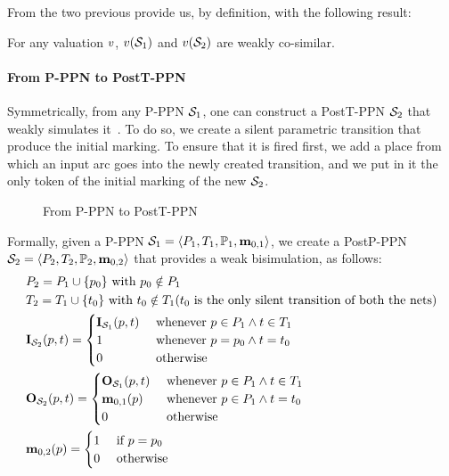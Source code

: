 From the two previous  provide us, by definition, with the following result:
\begin{lemm}
  \label{theo:cosimulation-p-ppn-postt-ppn}
  \label{theo:cosimulation-postt-ppn-p-ppn}
  For any valuation $\val$, $\val[{\namePPN[1]}]$ and $\val[{\namePPN[2]}]$ are weakly co-similar.
\end{lemm}


\paragraph{From P-\ac{PPN} to PostT-\ac{PPN}}
\label{sec:p-ppn-to-postt-ppn}

Symmetrically, from any P-\ac{PPN} $\namePPN[1]$, one can construct a PostT-\ac{PPN} $\namePPN[2]$ that weakly simulates it~\citep{David17}.
To do so, we create a silent parametric transition that produce the initial marking.
To ensure that it is fired first, we add a place from which an input arc goes into the newly created transition, and we put in it the only token of the initial marking of the new $\namePPN[2]$.

\begin{figure}[htbp]
  \centering
  
  \par
  \caption{From P-\ac{PPN} to PostT-\ac{PPN}}
  \label{fig:pppn-to-posttppn}
\end{figure}

Formally, given a P-\ac{PPN} $\defPPN[1]$, we create a PostP-\ac{PPN} $\defPPN[2]$ that provides a weak bisimulation, as follows:
\begin{align*}
  &\places_2 = \places_1 \cup           \{ p_0 \}
    \text{ with } p_0 \notin \places_1 \\
  &\transitions_2 = \transitions_1 \cup \{ t_0 \}
    \text{ with } t_0 \notin \transitions_1 \text{($t_0$ is  the only silent transition of both the nets)} \\
  &\inm[\namePPN[2]][p,t] = \begin{cases}
      \inm[\namePPN[1]][p,t] &\text{ whenever } p \in \places_1 \wedge t \in \transitions_1 \\
      1 &\text{ whenever } p = p_0 \wedge t = t_0 \\
      0 &\tothrw
    \end{cases} \\
  &\outm[\namePPN[2]][p,t] = \begin{cases}
      \outm[\namePPN[1]][p,t] &\text{ whenever } p \in \places_1 \wedge t \in \transitions_1 \\
      \mar_{0,1}(p) &\text{ whenever } p \in \places_1 \wedge t = t_0 \\
      0 &\tothrw
    \end{cases} \\
  &\mar_{0,2}(p) = \begin{cases}
      1 & \tif p = p_0 \\
      0 & \tothrw
    \end{cases}
\end{align*}

